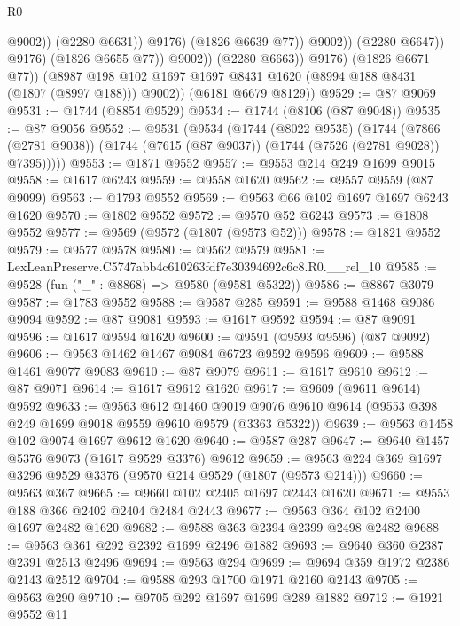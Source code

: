 \begin{lexlean}{R0}
\begin{coremodule}
                                      @9002))
                                  (@2280 @6631))
                                @9176)
                              (@1826 @6639 @77))
                            @9002))
                        (@2280 @6647))
                      @9176)
                    (@1826 @6655 @77))
                  @9002))
              (@2280 @6663))
            @9176)
          (@1826 @6671 @77))
        (@8987 @198 @102 @1697 @1697 @8431 @1620 (@8994 @188 @8431 (@1807 (@8997 @188))) @9002))
      (@6181 @6679 @8129))
@9529 := @87 @9069
@9531 := @1744 (@8854 @9529)
@9534 := @1744 (@8106 (@87 @9048))
@9535 := @87 @9056
@9552 := @9531
    (@9534
      (@1744
        (@8022 @9535)
        (@1744
          (@7866 (@2781 @9038))
          (@1744 (@7615 (@87 @9037)) (@1744 (@7526 (@2781 @9028)) @7395)))))
@9553 := @1871 @9552
@9557 := @9553 @214 @249 @1699 @9015
@9558 := @1617 @6243
@9559 := @9558 @1620
@9562 := @9557 @9559 (@87 @9099)
@9563 := @1793 @9552
@9569 := @9563 @66 @102 @1697 @1697 @6243 @1620
@9570 := @1802 @9552
@9572 := @9570 @52 @6243
@9573 := @1808 @9552
@9577 := @9569 (@9572 (@1807 (@9573 @52)))
@9578 := @1821 @9552
@9579 := @9577 @9578
@9580 := @9562 @9579
@9581 := LexLeanPreserve.C5747abb4c610263fdf7e30394692c6c8.R0.__rel_10
@9585 := @9528 (fun ("_" : @8868) => @9580 (@9581 @5322))
@9586 := @8867 @3079
@9587 := @1783 @9552
@9588 := @9587 @285
@9591 := @9588 @1468 @9086 @9094
@9592 := @87 @9081
@9593 := @1617 @9592
@9594 := @87 @9091
@9596 := @1617 @9594 @1620
@9600 := @9591 (@9593 @9596) (@87 @9092)
@9606 := @9563 @1462 @1467 @9084 @6723 @9592 @9596
@9609 := @9588 @1461 @9077 @9083
@9610 := @87 @9079
@9611 := @1617 @9610
@9612 := @87 @9071
@9614 := @1617 @9612 @1620
@9617 := @9609 (@9611 @9614) @9592
@9633 := @9563
    @612
    @1460
    @9019
    @9076
    @9610
    @9614
    (@9553 @398 @249 @1699 @9018 @9559 @9610 @9579 (@3363 @5322))
@9639 := @9563 @1458 @102 @9074 @1697 @9612 @1620
@9640 := @9587 @287
@9647 := @9640 @1457 @5376 @9073 (@1617 @9529 @3376) @9612
@9659 := @9563 @224 @369 @1697 @3296 @9529 @3376 (@9570 @214 @9529 (@1807 (@9573 @214)))
@9660 := @9563 @367
@9665 := @9660 @102 @2405 @1697 @2443 @1620
@9671 := @9553 @188 @366 @2402 @2404 @2484 @2443
@9677 := @9563 @364 @102 @2400 @1697 @2482 @1620
@9682 := @9588 @363 @2394 @2399 @2498 @2482
@9688 := @9563 @361 @292 @2392 @1699 @2496 @1882
@9693 := @9640 @360 @2387 @2391 @2513 @2496
@9694 := @9563 @294
@9699 := @9694 @359 @1972 @2386 @2143 @2512
@9704 := @9588 @293 @1700 @1971 @2160 @2143
@9705 := @9563 @290
@9710 := @9705 @292 @1697 @1699 @289 @1882
@9712 := @1921 @9552 @11

\end{coremodule}
\end{lexlean}
